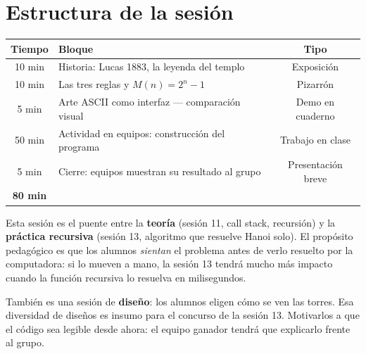\documentclass[12pt, oneside]{article}
\begin{document}

\tableofcontents
\newpage

\section{Estructura de la sesión}

\begin{center}
\begin{tabular}{clc}
  \toprule
  \textbf{Tiempo} & \textbf{Bloque} & \textbf{Tipo} \\
  \midrule
  10 min & Historia: Lucas 1883, la leyenda del templo & Exposición \\
  10 min & Las tres reglas y $M(n) = 2^n - 1$ & Pizarrón \\
   5 min & Arte ASCII como interfaz — comparación visual & Demo en cuaderno \\
  50 min & Actividad en equipos: construcción del programa & Trabajo en clase \\
   5 min & Cierre: equipos muestran su resultado al grupo & Presentación breve \\
  \midrule
  \textbf{80 min} & & \\
  \bottomrule
\end{tabular}
\end{center}

\begin{notaprofesor}
  Esta sesión es el puente entre la \textbf{teoría} (sesión 11, call stack,
  recursión) y la \textbf{práctica recursiva} (sesión 13, algoritmo que
  resuelve Hanoi solo).  El propósito pedagógico es que los alumnos \textit{sientan}
  el problema antes de verlo resuelto por la computadora: si lo mueven a mano,
  la sesión 13 tendrá mucho más impacto cuando la función recursiva lo resuelva
  en milisegundos.

  También es una sesión de \textbf{diseño}: los alumnos eligen cómo se ven las
  torres. Esa diversidad de diseños es insumo para el concurso de la sesión 13.
  Motivarlos a que el código sea legible desde ahora: el equipo ganador tendrá
  que explicarlo frente al grupo.
\end{notaprofesor}

\end{document}
